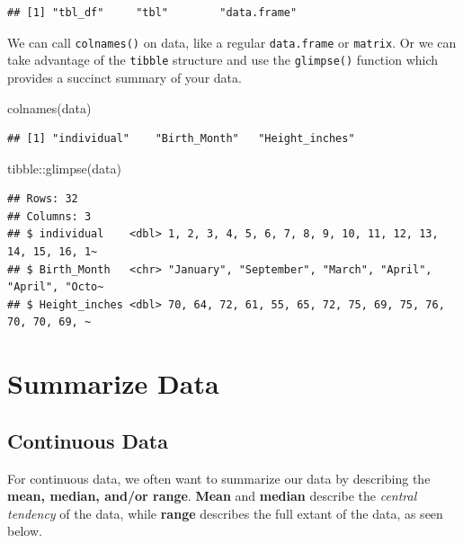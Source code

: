\documentclass[
]{book}
\newenvironment{Shaded}{\begin{snugshade}}{\end{snugshade}}
\newcommand{\FunctionTok}[1]{\textcolor[rgb]{0.00,0.00,0.00}{#1}}
\newcommand{\NormalTok}[1]{#1}
\newcommand{\SpecialCharTok}[1]{\textcolor[rgb]{0.00,0.00,0.00}{#1}}
\begin{document}
\begin{verbatim}
## [1] "tbl_df"     "tbl"        "data.frame"
\end{verbatim}

We can call \texttt{colnames()} on data, like a regular \texttt{data.frame} or \texttt{matrix}. Or we can take advantage of the \texttt{tibble} structure and use the \texttt{glimpse()} function which provides a succinct summary of your data.

\begin{Shaded}
\begin{Highlighting}[]
\FunctionTok{colnames}\NormalTok{(data)}
\end{Highlighting}
\end{Shaded}

\begin{verbatim}
## [1] "individual"    "Birth_Month"   "Height_inches"
\end{verbatim}

\begin{Shaded}
\begin{Highlighting}[]
\NormalTok{tibble}\SpecialCharTok{::}\FunctionTok{glimpse}\NormalTok{(data)}
\end{Highlighting}
\end{Shaded}

\begin{verbatim}
## Rows: 32
## Columns: 3
## $ individual    <dbl> 1, 2, 3, 4, 5, 6, 7, 8, 9, 10, 11, 12, 13, 14, 15, 16, 1~
## $ Birth_Month   <chr> "January", "September", "March", "April", "April", "Octo~
## $ Height_inches <dbl> 70, 64, 72, 61, 55, 65, 72, 75, 69, 75, 76, 70, 70, 69, ~
\end{verbatim}

\hypertarget{summarize-data}{%
\section*{Summarize Data}\label{summarize-data}}

\hypertarget{continuous-data}{%
\subsection*{Continuous Data}\label{continuous-data}}

For continuous data, we often want to summarize our data by describing the \textbf{mean, median, and/or range}. \textbf{Mean} and \textbf{median} describe the \emph{central tendency} of the data, while \textbf{range} describes the full extant of the data, as seen below.
\end{document}
